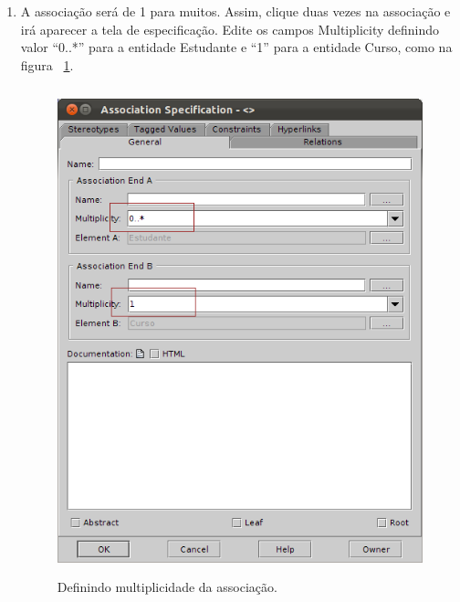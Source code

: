 \begin{enumerate}
\item A associação será de 1 para muitos. Assim, clique duas vezes na associação
e irá aparecer a tela de especificação. Edite os campos Multiplicity definindo
valor “0..*” para a entidade Estudante e “1” para a entidade Curso, como na
figura ~\ref{define_multiplicidade_associacao}.
\begin{figure}[!htb]
	\centering
	\includegraphics[width=350pt,height=400pt]{imgs/tutorial-mdarte-0005.png}
	\caption{Definindo multiplicidade da associação.}
	\label{define_multiplicidade_associacao}
\end{figure}
	

\end{enumerate}
